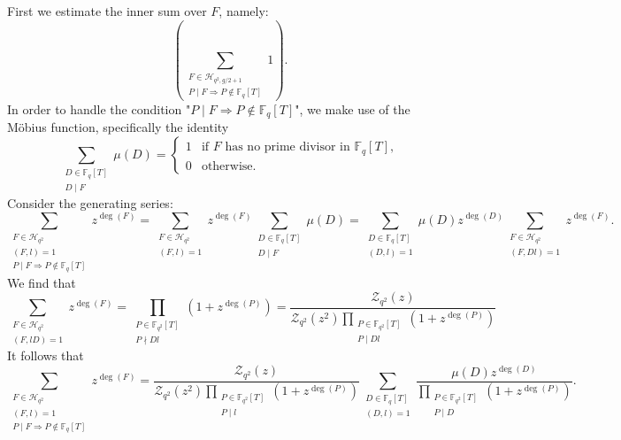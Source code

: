 \documentclass[table]{amsart}
\newcommand{\op}[1]{\operatorname{#1}}
\numberwithin{equation}{section}
\begin{document}
\noindent First we estimate the inner sum over $F$, namely: \[\left(\sum_{\substack{F \in \mathcal{H}_{q^{2}, g / 2+1} \\ P \mid F \Rightarrow P \notin \mathbb{F}_{q}[T]}} 1\right).\] \noindent In order to handle the condition "$P \mid F \Rightarrow P \notin \mathbb{F}_q[T]$", we make use of the M\"obius function, specifically the identity
\begin{equation}\label{mobius identity}
\sum_{\substack{D \in \mathbb{F}_q[T] \\ D \mid F}} \mu(D) = 
\begin{cases}
1 & \text{if } F \text{ has no prime divisor in } \mathbb{F}_q[T], \\
0 & \text{otherwise}.
\end{cases}
\end{equation}
\noindent Consider the generating series:
\begin{equation*}
\sum_{\substack{F \in \mathcal{H}_{q^{2}} \\(F, l)=1 \\ P \mid F \Rightarrow P \notin \mathbb{F}_{q}[T]}} z^{\op{deg}(F)}=\sum_{\substack{F \in \mathcal{H}_{q^{2}} \\(F, l)=1}} z^{\op{deg}(F)} \sum_{\substack{D \in \mathbb{F}_{q}[T] \\ D \mid F}} \mu(D)=\sum_{\substack{D \in \mathbb{F}_{q}[T] \\(D, l)=1}} \mu(D) z^{\op{deg}(D)} \sum_{\substack{F \in \mathcal{H}_{q^{2}} \\(F, D l)=1}} z^{\op{deg}(F)} . 
\end{equation*}
\noindent We find that 
\[\sum_{\substack{F \in \mathcal{H}_{q^{2}} \\(F, l D)=1}} z^{\op{deg}(F)}=\prod_{\substack{P \in \mathbb{F}_{q^{2}}[T] \\ P \nmid D l}}\left(1+z^{\op{deg}(P)}\right)=\frac{\mathcal{Z}_{q^{2}}(z)}{\mathcal{Z}_{q^{2}}\left(z^{2}\right) \prod_{\substack{P \in \mathbb{F}_{q^{2}}[T] \\ P \mid D l}}\left(1+z^{\op{deg}(P)}\right)}\]
\noindent It follows that
\begin{equation*}
\sum_{\substack{F \in \mathcal{H}_{q^{2}} \\(F, l)=1 \\ P \mid F \Rightarrow P \notin \mathbb{F}_{q}[T]}} z^{\op{deg}(F)}=\frac{\mathcal{Z}_{q^{2}}(z)}{\mathcal{Z}_{q^{2}}\left(z^{2}\right) \prod_{\substack{P \in \mathbb{F}_{q^{2}}[T] \\ P \mid  l}}\left(1+z^{\operatorname{deg}(P)}\right)}\sum_{\substack{D \in \mathbb{F}_{q}[T] \\(D, l)=1}} \frac{\mu(D) z^{\op{deg}(D)}}{\prod_{\substack{P \in \mathbb{F}_{q^{2}}[T] \\ P \mid  D}}\left(1+z^{\op{deg}(P)}\right)}  . 
\end{equation*}
\end{document}
